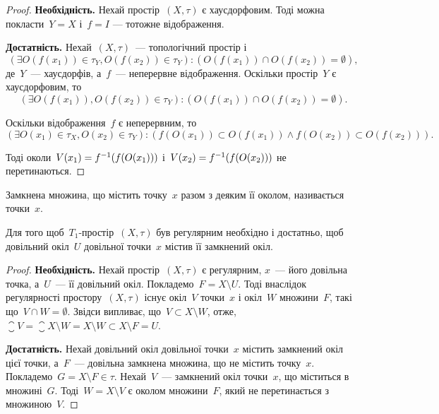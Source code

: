 \begin{proof}
    \textbf{Необхідність.} Нехай простір~$(X, \tau)$ є хаусдорфовим. Тоді можна покласти~$Y = X$ і~$f = I$ --- тотожне відображення.

    \textbf{Достатність.} Нехай~$(X, \tau)$~--- топологічний простір і
    \[ (\exists O(f(x_1)) \in \tau_Y, O(f(x_2)) \in \tau_Y): (O(f(x_1)) \cap O(f(x_2)) = \emptyset), \]
    де~$Y$~--- хаусдорфів, а~$f$~--- неперервне відображення. Оскільки простір~$Y$ є хаусдорфовим, то
    \[ (\exists O(f(x_1)), O(f(x_2)) \in \tau_Y): (O(f(x_1)) \cap O(f(x_2)) = \emptyset). \]

    Оскільки відображення~$f$ є неперервним, то
    \[ (\exists O(x_1) \in \tau_X, O(x_2) \in \tau_Y): (f(O(x_1)) \subset O(f(x_1)) \land f(O(x_2)) \subset O(f(x_2))). \]

    Тоді околи~$V(x_1) = f^{-1}(f(O(x_1)))$ і~$V(x_2) = f^{-1}(f(O(x_2)))$ не перетинаються.
\end{proof}

\begin{definition}
    Замкнена множина, що містить точку~$x$ разом з деяким її околом, називається  точки~$x$.
\end{definition}

\begin{theorem}
    Для того щоб~$T_1$-простір~$(X, \tau)$ був регулярним необхідно і достатньо, щоб довільний окіл~$U$ довільної точки~$x$ містив її замкнений окіл.
\end{theorem}

\begin{proof}
    \textbf{Необхідність.} Нехай простір~$(X, \tau)$ є регулярним, $x$~--- його довільна точка, а~$U$~--- її довільний окіл. Покладемо~$F = X \setminus U$. Тоді внаслідок регулярності простору~$(X, \tau)$ існує окіл~$V$ точки~$x$ і окіл~$W$ множини~$F$, такі що~$V \cap W = \emptyset$. Звідси випливає, що~$V \subset X \setminus W$, отже, $\closure{V} = \closure{X \setminus W} = X \setminus W \subset X \setminus F = U$.

    \textbf{Достатність.} Нехай довільний окіл довільної точки~$x$ містить замкнений окіл цієї точки, а~$F$~--- довільна замкнена множина, що не містить точку~$x$. Покладемо~$G = X \setminus F \in \tau$. Нехай~$V$~--- замкнений окіл точки~$x$, що міститься в множині~$G$. Тоді~$W = X \setminus V$ є околом множини~$F$, який не перетинається з множиною~$V$.
\end{proof}

